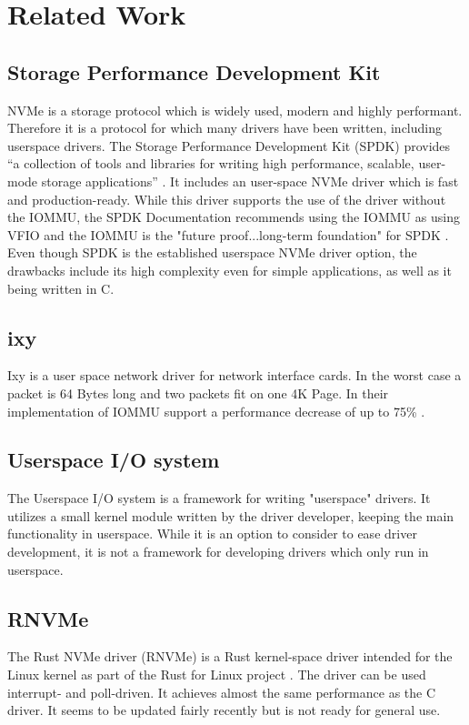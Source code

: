 \chapter{Related Work}

\section{Storage Performance Development Kit}
NVMe is a storage protocol which is widely used, modern and highly performant. Therefore it is a protocol for which many drivers have been written, including userspace drivers. The Storage Performance Development Kit (SPDK) provides ``a collection of tools and libraries for writing high performance, scalable, user-mode storage applications'' \cite{spdkindex}. It includes an user-space NVMe driver which is fast and production-ready. While this driver supports the use of the driver without the IOMMU, the SPDK Documentation recommends using the IOMMU as using VFIO and the IOMMU is the "future proof...long-term foundation" for SPDK \cite{spdkmemory}. Even though SPDK is the established userspace NVMe driver option, the drawbacks include its high complexity even for simple applications, as well as it being written in C.

\section{ixy} \label{s:ixy}
Ixy is a user space network driver for network interface cards. In the worst case a packet is 64 Bytes long and two packets fit on one 4K Page. In their implementation of IOMMU support a performance decrease of up to 75\% \cite{iommuhuber}.

\section{Userspace I/O system}
The Userspace I/O system is a framework for writing "userspace" drivers. It utilizes a small kernel module written by the driver developer, keeping the main functionality in userspace. While it is an option to consider to ease driver development, it is not a framework for developing drivers which only run in userspace.

\section{RNVMe}
The Rust NVMe driver (RNVMe) is a Rust kernel-space driver intended for the Linux kernel as part of the Rust for Linux project \cite{rnvmedriver}. The driver can be used interrupt- and poll-driven. It achieves almost the same performance as the C driver. It seems to be updated fairly recently but is not ready for general use.


